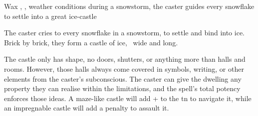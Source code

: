   {\mEarth}%
  {Wax}%
  {\detailed, \distant, \duplicated}%
  {weather conditions}%
  {during a snowstorm, the caster guides every snowflake to settle into a great ice-castle}%
  {
    The caster cries to every snowflake in a snowstorm, to settle and bind into ice.
    Brick by brick, they form a castle of ice, \spellArea\ wide and long.

    The castle only has shape, no doors, shutters, or anything more than halls and rooms.
    However, those halls always come covered in symbols, writing, or other elements from the caster's subconscious.
    The caster can give the dwelling any property they can realise within the limitations, and the spell's total potency enforces those ideas.
    A maze-like castle will add + to the \gls{tn} to navigate it, while an impregnable castle will add a penalty to assault it.
  }

